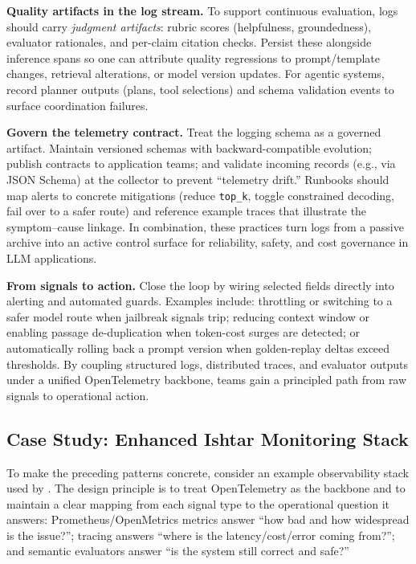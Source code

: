 \medskip
\noindent\textbf{Quality artifacts in the log stream.}
To support continuous evaluation, logs should carry \emph{judgment artifacts}: rubric scores (helpfulness, groundedness), evaluator rationales, and per-claim citation checks. Persist these alongside inference spans so one can attribute quality regressions to prompt/template changes, retrieval alterations, or model version updates. For agentic systems, record planner outputs (plans, tool selections) and schema validation events to surface coordination failures.

\medskip
\noindent\textbf{Govern the telemetry contract.}
Treat the logging schema as a governed artifact. Maintain versioned schemas with backward-compatible evolution; publish contracts to application teams; and validate incoming records (e.g., via JSON Schema) at the collector to prevent “telemetry drift.” Runbooks should map alerts to concrete mitigations (reduce \texttt{top\_k}, toggle constrained decoding, fail over to a safer route) and reference example traces that illustrate the symptom–cause linkage. In combination, these practices turn logs from a passive archive into an active control surface for reliability, safety, and cost governance in LLM applications.

\medskip
\noindent\textbf{From signals to action.}
Close the loop by wiring selected fields directly into alerting and automated guards. Examples include: throttling or switching to a safer model route when jailbreak signals trip; reducing context window or enabling passage de-duplication when token-cost surges are detected; or automatically rolling back a prompt version when golden-replay deltas exceed thresholds. By coupling structured logs, distributed traces, and evaluator outputs under a unified OpenTelemetry backbone, teams gain a principled path from raw signals to operational action.

\subsection{Case Study: Enhanced Ishtar Monitoring Stack}
\label{sec:case-study-enhanced-ishtar-monitoring-stack}

To make the preceding patterns concrete, consider an example observability stack used by \ishtar. The design principle is to treat OpenTelemetry as the backbone and to maintain a clear mapping from each signal type to the operational question it answers: Prometheus/OpenMetrics metrics answer ``how bad and how widespread is the issue?''; tracing answers ``where is the latency/cost/error coming from?''; and semantic evaluators answer ``is the system still correct and safe?''

